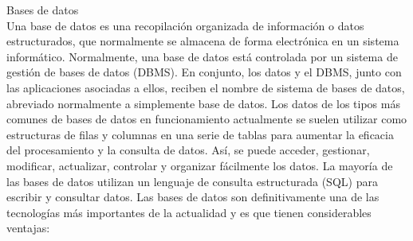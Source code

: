 \documentclass[12pt,onehalfspacing]{report}
\begin{document}
Bases de datos\\
Una base de datos es una recopilación organizada de información o datos estructurados, que normalmente se almacena de forma electrónica en un sistema informático. Normalmente, una base de datos está controlada por un sistema de gestión de bases de datos (DBMS). En conjunto, los datos y el DBMS, junto con las aplicaciones asociadas a ellos, reciben el nombre de sistema de bases de datos, abreviado normalmente a simplemente base de datos.
Los datos de los tipos más comunes de bases de datos en funcionamiento actualmente se suelen utilizar como estructuras de filas y columnas en una serie de tablas para aumentar la eficacia del procesamiento y la consulta de datos. Así, se puede acceder, gestionar, modificar, actualizar, controlar y organizar fácilmente los datos. La mayoría de las bases de datos utilizan un lenguaje de consulta estructurada (SQL) para escribir y consultar datos.
Las bases de datos son definitivamente una de las tecnologías más importantes de la actualidad y es que tienen considerables ventajas:
\end{document}
